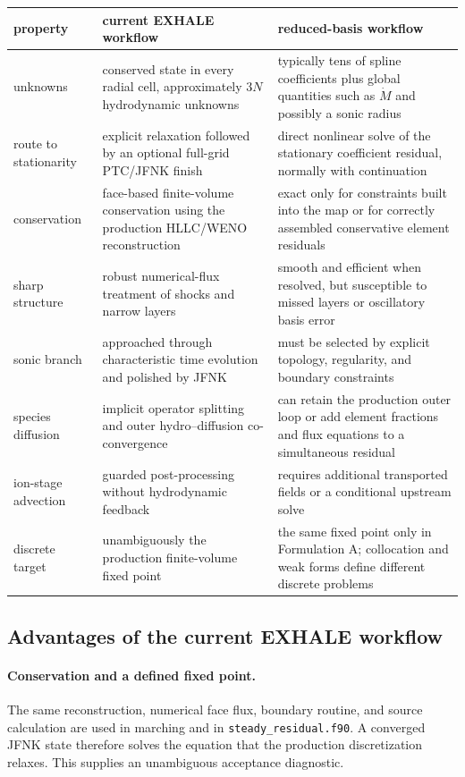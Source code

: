 \documentclass[english,a4paper]{my_memo}
\newcommand{\code}[1]{\texttt{#1}}
\newcommand{\mdot}{\dot M}
\begin{document}
\begin{center}\small
\begin{tabular}{@{}p{}p{}p{}@{}}
\toprule
property & current EXHALE workflow & reduced-basis workflow \\
\midrule
unknowns & conserved state in every radial cell, approximately \(3N\)
  hydrodynamic unknowns & typically tens of spline coefficients plus global
  quantities such as \(\mdot\) and possibly a sonic radius \\
route to stationarity & explicit relaxation followed by an optional full-grid
  PTC/JFNK finish & direct nonlinear solve of the stationary coefficient
  residual, normally with continuation \\
conservation & face-based finite-volume conservation using the production
  HLLC/WENO reconstruction & exact only for constraints built into the map or
  for correctly assembled conservative element residuals \\
sharp structure & robust numerical-flux treatment of shocks and narrow layers &
  smooth and efficient when resolved, but susceptible to missed layers or
  oscillatory basis error \\
sonic branch & approached through characteristic time evolution and polished by
  JFNK & must be selected by explicit topology, regularity, and boundary
  constraints \\
species diffusion & implicit operator splitting and outer hydro--diffusion
  co-convergence & can retain the production outer loop or add element fractions
  and flux equations to a simultaneous residual \\
ion-stage advection & guarded post-processing without hydrodynamic feedback &
  requires additional transported fields or a conditional upstream solve \\
discrete target & unambiguously the production finite-volume fixed point & the
  same fixed point only in Formulation A; collocation and weak forms define
  different discrete problems \\
\bottomrule
\end{tabular}
\end{center}

\subsection{Advantages of the current EXHALE workflow}

\paragraph{Conservation and a defined fixed point.}
The same reconstruction, numerical face flux, boundary routine, and source
calculation are used in marching and in \code{steady\_residual.f90}.  A
converged JFNK state therefore solves the equation that the production
discretization relaxes.  This supplies an unambiguous acceptance diagnostic.
\end{document}
